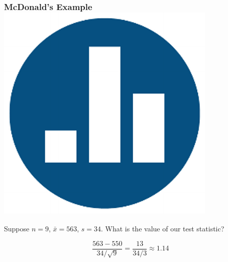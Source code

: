 \begin{frame}
\frametitle{McDonald's Example\hfill \includegraphics[scale = 0.05]{./images/clicker}}
Suppose $n=9$, $\bar{x} = 563$, $s = 34$. What is  the value of our test statistic?

\pause
\vspace{1em}
	$$\frac{563 - 550}{34/\sqrt{9}}= \frac{13}{34/3} \approx 1.14$$


\end{frame}

